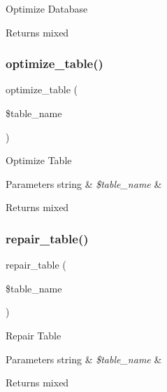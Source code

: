 Optimize Database

\begin{DoxyReturn}{Returns}
mixed 
\end{DoxyReturn}
\mbox{\label{class_c_i___d_b__utility_a6aed9274f43b64eeee607d172b51529d}} 
\subsubsection{\texorpdfstring{optimize\+\_\+table()}{optimize\_table()}}
{\footnotesize\ttfamily optimize\+\_\+table (\begin{DoxyParamCaption}\item[{}]{\$table\+\_\+name }\end{DoxyParamCaption})}

Optimize Table


\begin{DoxyParams}[1]{Parameters}
string & {\em \$table\+\_\+name} & \\
\hline
\end{DoxyParams}
\begin{DoxyReturn}{Returns}
mixed 
\end{DoxyReturn}
\mbox{\label{class_c_i___d_b__utility_a41a627004d26198c69bf466eef7eaeeb}} 
\subsubsection{\texorpdfstring{repair\+\_\+table()}{repair\_table()}}
{\footnotesize\ttfamily repair\+\_\+table (\begin{DoxyParamCaption}\item[{}]{\$table\+\_\+name }\end{DoxyParamCaption})}

Repair Table


\begin{DoxyParams}[1]{Parameters}
string & {\em \$table\+\_\+name} & \\
\hline
\end{DoxyParams}
\begin{DoxyReturn}{Returns}
mixed 
\end{DoxyReturn}
\mbox{\label{class_c_i___d_b__utility_a21f75f7a8f3c41f9d2ec60b00f412783}} 
